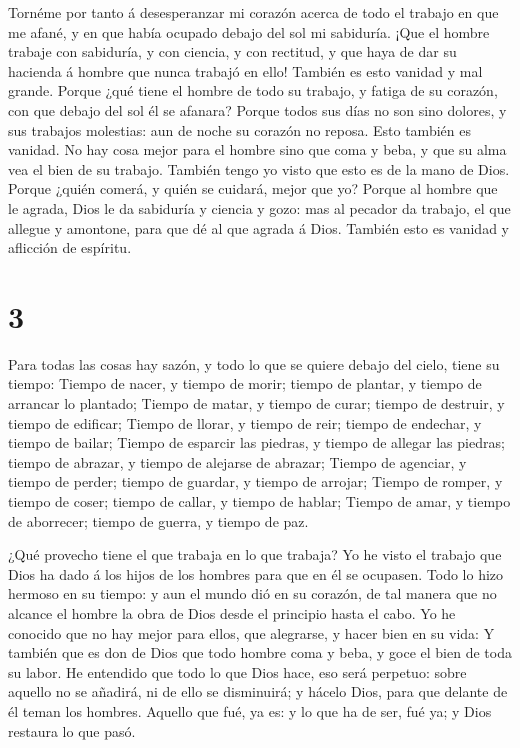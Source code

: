  Tornéme por tanto á desesperanzar mi corazón acerca de
todo el trabajo en que me afané, y en que había ocupado debajo del sol
mi sabiduría.  ¡Que el hombre trabaje con sabiduría, y con
ciencia, y con rectitud, y que haya de dar su hacienda á hombre que
nunca trabajó en ello! También es esto vanidad y mal grande.
 Porque ¿qué tiene el hombre de todo su trabajo, y fatiga
de su corazón, con que debajo del sol él se afanara? 
Porque todos sus días no son sino dolores, y sus trabajos molestias: aun
de noche su corazón no reposa. Esto también es vanidad.  No
hay cosa mejor para el hombre sino que coma y beba, y que su alma vea el
bien de su trabajo. También tengo yo visto que esto es de la mano de
Dios.  Porque ¿quién comerá, y quién se cuidará, mejor que
yo?  Porque al hombre que le agrada, Dios le da sabiduría y
ciencia y gozo: mas al pecador da trabajo, el que allegue y amontone,
para que dé al que agrada á Dios. También esto es vanidad y aflicción de
espíritu.

\hypertarget{section-2}{%
\section{3}\label{section-2}}

 Para todas las cosas hay sazón, y todo lo que se quiere
debajo del cielo, tiene su tiempo:  Tiempo de nacer, y
tiempo de morir; tiempo de plantar, y tiempo de arrancar lo plantado;
 Tiempo de matar, y tiempo de curar; tiempo de destruir, y
tiempo de edificar;  Tiempo de llorar, y tiempo de reir;
tiempo de endechar, y tiempo de bailar;  Tiempo de esparcir
las piedras, y tiempo de allegar las piedras; tiempo de abrazar, y
tiempo de alejarse de abrazar;  Tiempo de agenciar, y tiempo
de perder; tiempo de guardar, y tiempo de arrojar;  Tiempo
de romper, y tiempo de coser; tiempo de callar, y tiempo de hablar;
 Tiempo de amar, y tiempo de aborrecer; tiempo de guerra, y
tiempo de paz.

 ¿Qué provecho tiene el que trabaja en lo que trabaja?
 Yo he visto el trabajo que Dios ha dado á los hijos de los
hombres para que en él se ocupasen.  Todo lo hizo hermoso
en su tiempo: y aun el mundo dió en su corazón, de tal manera que no
alcance el hombre la obra de Dios desde el principio hasta el cabo.
 Yo he conocido que no hay mejor para ellos, que alegrarse,
y hacer bien en su vida:  Y también que es don de Dios que
todo hombre coma y beba, y goce el bien de toda su labor. 
He entendido que todo lo que Dios hace, eso será perpetuo: sobre aquello
no se añadirá, ni de ello se disminuirá; y hácelo Dios, para que delante
de él teman los hombres.  Aquello que fué, ya es: y lo que
ha de ser, fué ya; y Dios restaura lo que pasó.

